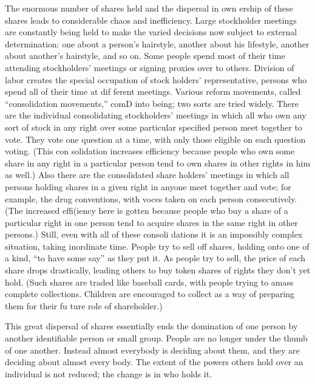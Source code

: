 \documentclass[11pt,openany]{book}
\begin{document}
The enormous number of shares held and the dispersal in own ership of these shares leads to considerable chaos and inefficiency. Large stockholder meetings are constantly being held to make the varied decisions now subject to external determination: one about a person's hairstyle, another about his lifestyle, another about another's hairstyle, and so on. Some people spend most of their time attending stockholders' meetings or signing proxies over to others. Division of labor creates the special occupation of stock holders' representative, persons who spend all of their time at dif ferent meetings. Various reform movements, called ``consolidation movements,'' comD into being; two sorts are tried widely. There are the individual consolidating stockholders' meetings in which all who own any sort of stock in any right over some particular specified person meet together to vote. They vote one question at a time, with only those eligible on each question voting. (This con solidation increases efficiency because people who own some share in any right in a particular person tend to own shares in other rights in him as well.) Also there are the consolidated share holders' meetings in which all persons holding shares in a given right in anyone meet together and vote; for example, the drug conventions, with voces taken on each person consecutively. (The increased effi(iency here is gotten because people who buy a share of a particular right in one person tend to acquire shares in the same right in other persons.) Still, even with all of these consoli dations it is an impossibly complex situation, taking inordinate time. People try to sell off shares, holding onto one of a kind, ``to have some say'' as they put it. As people try to sell, the price of each share drops drastically, leading others to buy token shares of rights they don't yet hold. (Such shares are traded like baseball cards, with people trying to amass complete collections. Children are encouraged to collect as a way of preparing them for their fu ture role of shareholder.) 

This great dispersal of shares essentially ends the domination of one person by another identifiable person or small group. People are no longer under the thumb of one another. Instead almost everybody is deciding about them, and they are deciding about almost every body. The extent of the powers others hold over an individual is not reduced; the change is in who holds it. 
\end{document}
